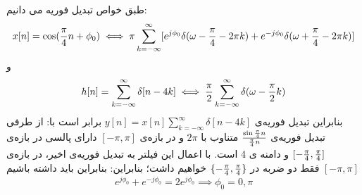 \documentclass[10pt,letterpaper]{article}
\begin{document}
طبق خواص تبدیل فوریه می دانیم:
$$
x[n]=\cos ({\pi\over 4}n+\phi_0)\iff \pi\sum_{k=-\infty}^{\infty} [e^{j\phi_0}\delta(\omega-{\pi\over 4}-2\pi k)+e^{-j\phi_0}\delta(\omega+{\pi\over 4}-2\pi k)]
$$
و
$$
h[n]=\sum_{k=-\infty}^{\infty} \delta[n-4k]\iff
{\pi\over 2}\sum_{k=-\infty}^{\infty} \delta(\omega-{\pi\over 2}k)
$$
بنابراین تبدیل فوریه‌ی 
$
y[n]=x[n]\sum_{k=-\infty}^{\infty} \delta[n-4k]
$
 برابر است با:
از طرفی تبدیل فوریه‌ی 
$
{\sin{\pi\over 4}n\over {\pi\over 4}n}
$
 متناوب با $2\pi$ و در بازه‌ی $[-\pi,\pi]$ دارای پالسی در بازه‌ی 
$
[-{\pi\over 4},{\pi\over 4}]
$
 و دامنه ی 4 است. با اعمال این فیلتر به تبدیل فوریه‌ی اخیر، در بازه‌ی $[-\pi,\pi]$  فقط دو ضربه در 
$
\{-{\pi\over 4},{\pi\over 4}\}
$
 خواهیم داشت؛ بنابراین:
بنابراین باید داشته باشیم
$$
e^{j\phi_0}+e^{-j\phi_0}=2e^{j\phi_0}\implies \phi_0=0,\pi
$$
\end{document}
